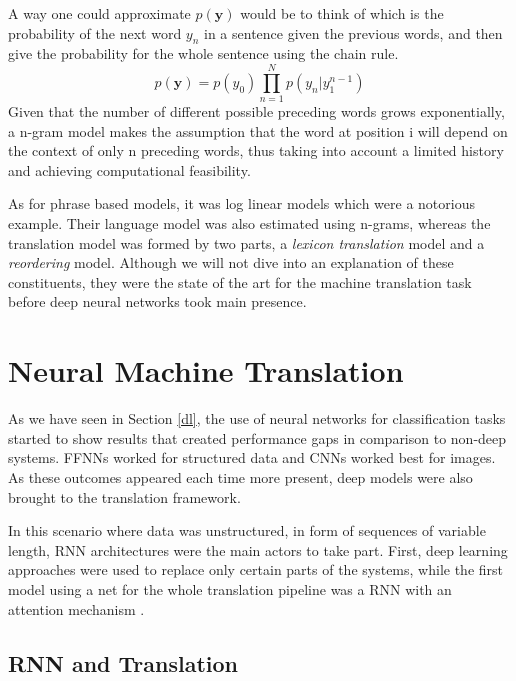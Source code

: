 \documentclass[11pt,english,listoffigures,listoftables]{tfgetsinf}
\newcommand{\vect}[1]{\mathbf{#1}}
\begin{document}
A way one could approximate $p(\vect{y})$ would be to think of which is the probability of the next word $y_n$ in a sentence given the previous words, and then give the probability for the whole sentence using the chain rule.
\begin{equation}
    p(\vect{y}) = p(y_0) \prod_{n=1}^{N} p(y_n | y_1^{n-1})
\end{equation}
Given that the number of different possible preceding words grows exponentially, a n-gram model makes the assumption that the word at position i will depend on the context of only n preceding words, thus taking into account a limited history and achieving computational feasibility.

As for phrase based models, it was log linear models which were a notorious example.
Their language model was also estimated using n-grams, whereas the translation model was formed by two parts, a \textit{lexicon translation} model and a \textit{reordering} model. 
Although we will not dive into an explanation of these constituents, they were the state of the art for the machine translation task before deep neural networks took main presence.


\section{Neural Machine Translation}

As we have seen in Section \ref{dl}, the use of neural networks for classification tasks started to show results that created performance gaps in comparison to non-deep systems. FFNNs worked for structured data and CNNs worked best for images. As these outcomes appeared each time more present, deep models were also brought to the translation framework.

In this scenario where data was unstructured, in form of sequences of variable length, RNN architectures were the main actors to take part.
First, deep learning approaches were used to replace only certain parts of the systems, while the first model using a net for the whole translation pipeline was a RNN with an attention mechanism \cite{https://doi.org/10.48550/arxiv.1409.0473}.


\subsection{RNN and Translation}\label{nmtrnn}
\end{document}
